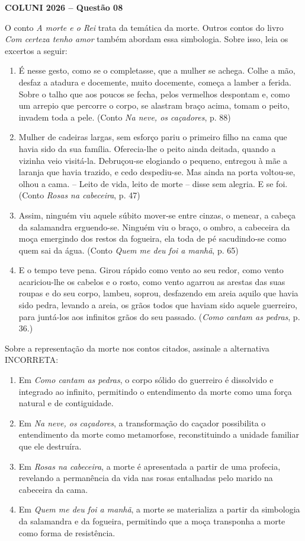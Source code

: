 \textbf{COLUNI 2026 -- Questão 08}\par\medskip O conto \textit{A morte e o Rei} trata da temática da morte. Outros contos do livro \textit{Com certeza tenho amor} também abordam essa simbologia. Sobre isso, leia os excertos a seguir:

\begin{enumerate}
\item É nesse gesto, como se o completasse, que a mulher se achega. Colhe a mão, desfaz a atadura e docemente, muito docemente, começa a lamber a ferida. Sobre o talho que aos poucos se fecha, pelos vermelhos despontam e, como um arrepio que percorre o corpo, se alastram braço acima, tomam o peito, invadem toda a pele. (Conto \textit{Na neve, os caçadores}, p. 88)
\item Mulher de cadeiras largas, sem esforço pariu o primeiro filho na cama que havia sido da sua família. Oferecia-lhe o peito ainda deitada, quando a vizinha veio visitá-la. Debruçou-se elogiando o pequeno, entregou à mãe a laranja que havia trazido, e cedo despediu-se. Mas ainda na porta voltou-se, olhou a cama. – Leito de vida, leito de morte – disse sem alegria. E se foi. (Conto \textit{Rosas na cabeceira}, p. 47)
\item Assim, ninguém viu aquele súbito mover-se entre cinzas, o menear, a cabeça da salamandra erguendo-se. Ninguém viu o braço, o ombro, a cabeceira da moça emergindo dos restos da fogueira, ela toda de pé sacudindo-se como quem sai da água. (Conto \textit{Quem me deu foi a manhã}, p. 65)
\item E o tempo teve pena. Girou rápido como vento ao seu redor, como vento acariciou-lhe os cabelos e o rosto, como vento agarrou as arestas das suas roupas e do seu corpo, lambeu, soprou, desfazendo em areia aquilo que havia sido pedra, levando a areia, os grãos todos que haviam sido aquele guerreiro, para juntá-los aos infinitos grãos do seu passado. (\textit{Como cantam as pedras}, p. 36.)
\end{enumerate}

Sobre a representação da morte nos contos citados, assinale a alternativa INCORRETA:
\begin{enumerate}
\item Em \textit{Como cantam as pedras}, o corpo sólido do guerreiro é dissolvido e integrado ao infinito, permitindo o entendimento da morte como uma força natural e de contiguidade.
\item Em \textit{Na neve, os caçadores}, a transformação do caçador possibilita o entendimento da morte como metamorfose, reconstituindo a unidade familiar que ele destruíra.
\item Em \textit{Rosas na cabeceira}, a morte é apresentada a partir de uma profecia, revelando a permanência da vida nas rosas entalhadas pelo marido na cabeceira da cama.
\item Em \textit{Quem me deu foi a manhã}, a morte se materializa a partir da simbologia da salamandra e da fogueira, permitindo que a moça transponha a morte como forma de resistência.
\end{enumerate}
